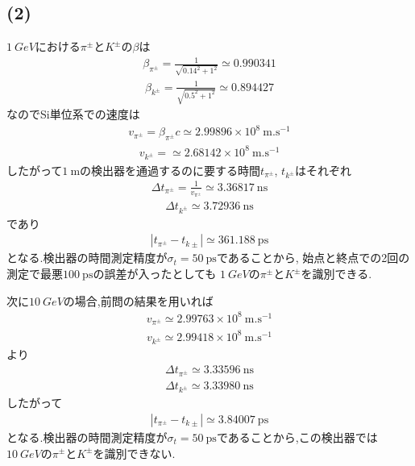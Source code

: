 \documentclass[uplatex,a4j,11pt,dvipdfmx]{jsarticle}
\begin{document}
\subsection*{(2)}
$1\ \si{GeV}$における$\pi^\pm$と$K^\pm$の$\beta$は
\begin{align*}
  \beta_{\pi^\pm}=\frac{1}{\sqrt{0.14^2+1^2}}\simeq0.990341
\end{align*}
\begin{align*}
  \beta_{k^\pm}=\frac{1}{\sqrt{0.5^2+1^2}}\simeq0.894427
\end{align*}
なのでSi単位系での速度は
\begin{align*}
  v_{\pi^\pm}=\beta_{\pi^\pm} c\simeq2.99896\times10^8\ \si{\metre.\second^{-1}}
\end{align*}
\begin{align*}
  v_{k^\pm}=\simeq2.68142\times10^8\ \si{\metre.\second^{-1}}
\end{align*}
したがって$1\ \si{\metre}$の検出器を通過するのに要する時間$t_{\pi^\pm}$, $t_{k^\pm}$はそれぞれ
\begin{align*}
  \Delta t_{\pi^\pm}=\frac{1}{v_{\pi^\pm}}\simeq3.36817\ \si{\nano\second}
\end{align*}
\begin{align*}
  \Delta t_{k^\pm}\simeq3.72936\ \si{\nano\second}
\end{align*}
であり
\begin{align*}
  |t_{\pi^\pm}-t_{k\pm}|\simeq361.188\ \si{\pico\second}
\end{align*}
となる.検出器の時間測定精度が$\sigma_t=50\ \si{\pico\second}$であることから,
始点と終点での2回の測定で最悪$100\ \si{\pico\second}$の誤差が入ったとしても
$1\ \si{GeV}$の$\pi^\pm$と$K^\pm$を識別できる.

次に$10\ \si{GeV}$の場合,前問の結果を用いれば
\begin{align*}
  v_{\pi^\pm}\simeq2.99763\times10^8\ \si{\metre.\second^{-1}}
\end{align*}
\begin{align*}
  v_{k^\pm}\simeq2.99418\times10^8\ \si{\metre.\second^{-1}}
\end{align*}
より
\begin{align*}
  \Delta t_{\pi^\pm}\simeq3.33596\ \si{\nano\second}
\end{align*}
\begin{align*}
  \Delta t_{k^\pm}\simeq3.33980\ \si{\nano\second}
\end{align*}
したがって
\begin{align*}
  |t_{\pi^\pm}-t_{k\pm}|\simeq3.84007\ \si{\pico\second}
\end{align*}
となる.検出器の時間測定精度が$\sigma_t=50\ \si{\pico\second}$であることから,この検出器では
$10\ \si{GeV}$の$\pi^\pm$と$K^\pm$を識別できない.

\end{document}

